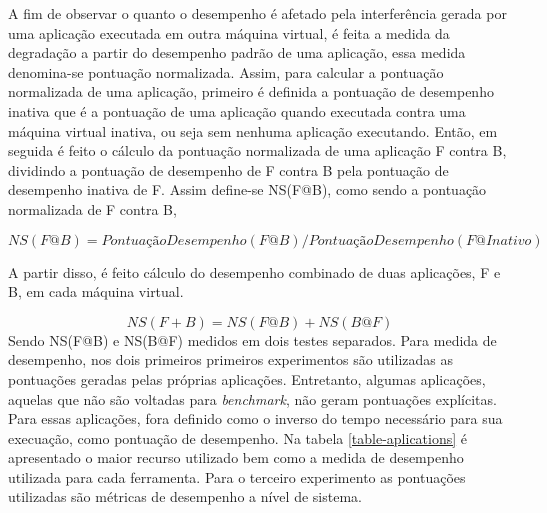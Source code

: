 A fim de observar o quanto o desempenho é afetado pela interferência gerada por uma aplicação executada em outra máquina virtual, é feita a medida da degradação a partir do desempenho padrão de uma aplicação, essa medida denomina-se pontuação normalizada. Assim, para calcular a pontuação normalizada de uma aplicação, primeiro é definida a pontuação de desempenho inativa que é a pontuação de uma aplicação quando executada contra uma máquina virtual inativa, ou seja sem nenhuma aplicação executando. Então, em seguida é feito o cálculo da pontuação normalizada de uma aplicação F contra B, dividindo a pontuação de desempenho de F contra B pela pontuação de desempenho inativa de F. Assim define-se NS(F@B), como sendo a pontuação normalizada de F contra B,

\begin{equation}
\label{eq:degradation}
NS(F@B) = PontuaçãoDesempenho(F@B)/PontuaçãoDesempenho(F@Inativo)
\end{equation}

A partir disso, é feito cálculo do desempenho combinado de duas aplicações, F e B, em cada máquina virtual.

\begin{equation}
\label{eq:combined}
NS ( F + B ) = NS ( F @ B ) + NS ( B @ F )
\end{equation}
Sendo NS(F@B) e  NS(B@F) medidos em dois testes separados. Para medida de desempenho, nos dois primeiros primeiros experimentos são utilizadas as pontuações geradas pelas próprias aplicações. Entretanto, algumas aplicações, aquelas que não são voltadas para \textit{benchmark}, não geram pontuações explícitas. Para essas aplicações, fora definido como o inverso do tempo necessário para sua execuação, como pontuação de desempenho. Na tabela \ref{table-aplications} é apresentado o maior recurso utilizado bem como a medida de desempenho utilizada para cada ferramenta. Para o terceiro experimento as pontuações utilizadas são métricas de desempenho a nível de sistema.

